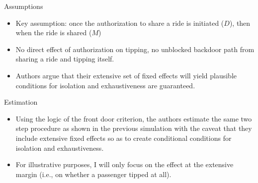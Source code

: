 \documentclass{beamer}
\begin{document}
\begin{frame}{Assumptions}
  \begin{center}
  \end{center}

  \begin{itemize}

    \item Key assumption: once the authorization to share a ride is initiated ($D$), then when the ride is shared ($M$)
    \item No direct effect of authorization on tipping, no unblocked backdoor path from sharing a ride and tipping itself.
    \item Authors argue that their extensive set of fixed effects will yield plausible conditions for isolation and exhaustiveness are guaranteed.
  \end{itemize}

\end{frame}


\begin{frame}{Estimation}

  \begin{itemize}
    \item Using the logic of the front door criterion, the authors estimate the same two step procedure as shown in the previous simulation with the caveat that they include extensive fixed effects so as to create conditional conditions for isolation and exhaustiveness.
    \item For illustrative purposes, I will only focus on the effect at the extensive margin (i.e., on whether a passenger tipped at all).
  \end{itemize}

\end{frame}
\end{document}
